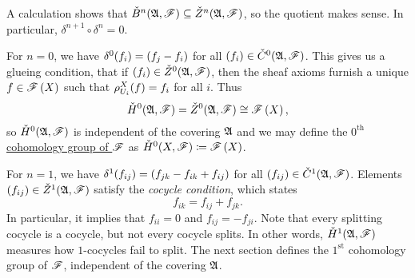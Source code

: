 \documentclass[../Moduli_Spaces_of_Riemann_Surfaces.tex]{subfiles}
\begin{document}
    \vspace{-0.05in}
    \begin{remark}
        A calculation shows that $\check{B}^n\!\left(\mathfrak{A},\mathscr{F}\right)\subseteq\check{Z}^n\!\left(\mathfrak{A},\mathscr{F}\right)$, so the quotient makes sense. In particular, $\delta^{n+1}\circ\delta^n=0$.\exqed
    \end{remark}
    \begin{remark}
        For $n=0$, we have $\delta^0\!\left(f_i\right)=\left(f_j-f_i\right)$ for all $\left(f_i\right)\in\check{C}^0\!\left(\mathfrak{A},\mathscr{F}\right)$. This gives us a glueing condition, that if $\left(f_i\right)\in\check{Z}^0\!\left(\mathfrak{A},\mathscr{F}\right)$, then the sheaf axioms furnish a unique $f\in\mathscr{F}\left(X\right)$ such that $\rho^X_{U_i}\!\left(f\right)=f_i$ for all $i$. Thus
        \begin{equation*}
            \check{H}^0\!\left(\mathfrak{A},\mathscr{F}\right)=\check{Z}^0\!\left(\mathfrak{A},\mathscr{F}\right)\cong\mathscr{F}\left(X\right),
        \end{equation*}
        so $\check{H}^0\!\left(\mathfrak{A},\mathscr{F}\right)$ is independent of the covering $\mathfrak{A}$ and we may define the \ul{$0^\textrm{th}$ cohomology group of $\mathscr{F}$} as $\check{H}^0\!\left(X,\mathscr{F}\right)\coloneqq\mathscr{F}\left(X\right)$.\exqed
    \end{remark}
    \begin{remark}
        For $n=1$, we have $\delta^1\!\left(f_{ij}\right)=\left(f_{jk}-f_{ik}+f_{ij}\right)$ for all $\left(f_{ij}\right)\in\check{C}^1\!\left(\mathfrak{A},\mathscr{F}\right)$. Elements $\left(f_{ij}\right)\in\check{Z}^1\!\left(\mathfrak{A},\mathscr{F}\right)$ satisfy the \textit{cocycle condition}, which states
        \begin{equation*}
            f_{ik}=f_{ij}+f_{jk}.
        \end{equation*}
        In particular, it implies that $f_{ii}=0$ and $f_{ij}=-f_{ji}$. Note that every splitting cocycle is a cocycle, but not every cocycle splits. In other words, $\check{H}^1\!\left(\mathfrak{A},\mathscr{F}\right)$ measures how $1$-cocycles fail to split. The next section defines the $1^\textrm{st}$ cohomology group of $\mathscr{F}$, independent of the covering $\mathfrak{A}$.\exqed
    \end{remark}
\end{document}
